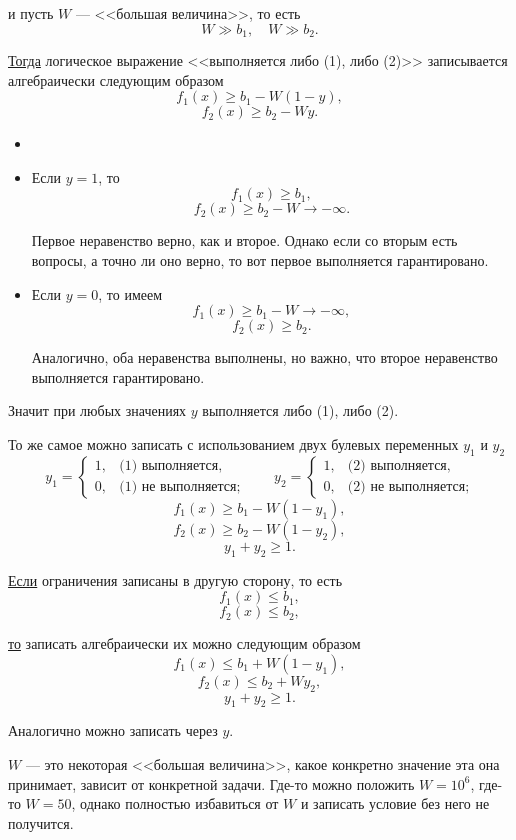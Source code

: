 и пусть $W$ --- <<большая величина>>, то есть
\[
W \gg b_1, \quad W \gg b_2.
\]

\underline{Тогда} логическое выражение <<выполняется либо (1), либо (2)>> записывается алгебраически следующим образом
\[f_1(x) \ge b_1 - W(1-y),\]
\[f_2(x) \ge b_2 - Wy.\]
\[\]

\prooof

\begin{itemize}[nosep]
	\item[]	
	\item Если $y = 1$, то
	\[f_1(x) \ge b_1,\]
	\[f_2(x) \ge b_2 - W \to -\infty.\]
	
	Первое неравенство верно, как и второе. Однако если со вторым есть вопросы, а точно ли оно верно, то вот первое выполняется гарантировано.
	
	\item Если $y = 0$, то имеем
	\[f_1(x) \ge b_1 - W \to -\infty,\]
	\[f_2(x) \ge b_2.\]
	
	Аналогично, оба неравенства выполнены, но важно, что второе неравенство выполняется гарантировано.
\end{itemize}

Значит при любых значениях $y$ выполняется либо (1), либо (2).

\remark

То же самое можно записать с использованием двух булевых переменных $y_1$ и $y_2$
\[
y_1 = \begin{cases}
	1,& \text{(1) выполняется},\\
	0,&\text{(1) не выполняется};
\end{cases} \quad\quad y_2 = \begin{cases}
1,& \text{(2) выполняется},\\
0,&\text{(2) не выполняется};
\end{cases}
\]
\[f_1(x) \ge b_1 - W(1-y_1),\]
\[f_2(x) \ge b_2 - W(1-y_2),\]
\[y_1+y_2 \ge 1.\]

\remark

\underline{Если} ограничения записаны в другую сторону, то есть
\[f_1(x) \le b_1,\]
\[f_2(x) \le b_2,\]

\underline{то} записать алгебраически их можно следующим образом
\[f_1(x) \le b_1 + W(1-y_1),\]
\[f_2(x) \le b_2 + Wy_2,\]
\[y_1 + y_2 \ge 1.\]

Аналогично можно записать через $y$.

\remark

$W$ --- это некоторая <<большая величина>>, какое конкретно значение эта она принимает, зависит от конкретной задачи. Где-то можно положить $W = 10^6$, где-то $W = 50$, однако полностью избавиться от $W$ и записать условие без него не получится.

